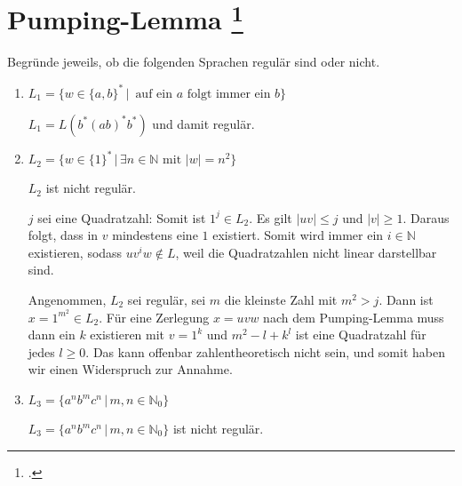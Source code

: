 \documentclass{lehramt-informatik-aufgabe}
\begin{document}
\section{Pumping-Lemma
\footcite{theo:ab:1}}

Begründe jeweils, ob die folgenden Sprachen regulär sind oder nicht.

\begin{enumerate}


\item $L_1 = \{w \in \{a, b\}^* \,|\, \text{ auf ein } a \text{ folgt
immer ein } b\}$

\begin{liAntwort}
$L_1 = L(b^* (ab)^* b^*)$ und damit regulär.
\end{liAntwort}


\item $L_2 = \{ w \in \{ 1 \}^* \,|\, \exists n \in \mathbb{N} \text{ mit }
|w| = n^2\}$

\begin{liAntwort}
$L_2$ ist nicht regulär.


$j$ sei eine Quadratzahl: Somit ist $1^j \in L_2$. Es gilt $|uv| \leq j$
und $|v| \geq 1$. Daraus folgt, dass in $v$ mindestens eine $1$
existiert. Somit wird immer ein $i \in \mathbb{N}$ existieren, sodass
$uv^iw \notin L$, weil die Quadratzahlen nicht linear darstellbar sind.


Angenommen, $L_2$ sei regulär, sei $m$ die kleinste Zahl mit $m^2 > j$.
Dann ist $x = 1^{m^2} \in L_2$. Für eine Zerlegung $x = uvw$ nach dem
Pumping-Lemma muss dann ein $k$ existieren mit $v = 1^k$ und $m^2 - l +
k^l$ ist eine Quadratzahl für jedes $l \geq 0$. Das kann offenbar
zahlentheoretisch nicht sein, und somit haben wir einen Widerspruch zur
Annahme.
\end{liAntwort}


\item $L_3 = \{ a^n b^m c^n \,|\, m, n \in \mathbb{N}_0 \}$

\begin{liAntwort}
$L_3 = \{ a^n b^m c^n \,|\, m, n \in \mathbb{N}_0 \}$ ist nicht regulär.


\end{liAntwort}
\end{enumerate}
\end{document}
